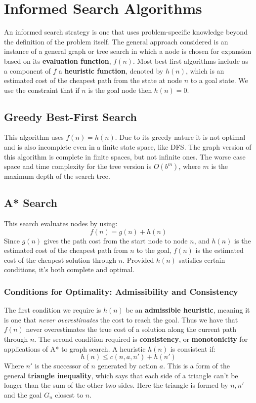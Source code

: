 \documentclass[twoside]{article}
\begin{document}
\section{Informed Search Algorithms}
An informed search strategy is one that uses problem-specific knowledge beyond
the definition of the problem itself. The general approach considered is an
instance of a general graph or tree search in which a node is chosen for 
expansion based on its \textbf{evaluation function}, \(f(n)\). Most best-first
algorithms include as a component of \(f\) a \textbf{heuristic function},
denoted by \(h(n)\), which is an estimated cost of the cheapest path from
the state at node \(n\) to a goal state. We use the constraint that if \(n\)
is the goal node then \(h(n) = 0\).
\subsection{Greedy Best-First Search}
This algorithm uses \(f(n) = h(n)\). Due to its greedy nature it is not 
optimal and is also incomplete even in a finite state space, like DFS. The graph
version of this algorithm is complete in finite spaces, but not infinite ones.
The worse case space and time complexity for the tree version is \(O(b^m)\),
where \(m\) is the maximum depth of the search tree.
\subsection{A* Search}
This search evaluates nodes by using:
\begin{equation}
        f(n) = g(n) + h(n)
\end{equation}
Since \(g(n)\) gives the path cost from the start node to node \(n\), and 
\(h(n)\) is the estimated cost of the cheapest path from \(n\) to the goal,
\(f(n)\) is the estimated cost of the cheapest solution through \(n\). Provided 
\(h(n)\) satisfies certain conditions, it's both complete and optimal.
\subsubsection{Conditions for Optimality: Admissibility and Consistency}
The first condition we require is \(h(n)\) be an \textbf{admissible heuristic},
meaning it is one that \emph{never overestimates} the cost to reach the goal.
Thus we have that \(f(n)\) never overestimates the true cost of a solution along
the current path through \(n\). The second condition required is 
\textbf{consistency}, or \textbf{monotonicity} for applications of A* to graph
search. A heuristic \(h(n)\) is consistent if:
\begin{equation}
        h(n) \leq c(n,a,n') + h(n')
\end{equation}
Where \(n'\) is the successor of \(n\) generated by action \(a\). This is a form
of the general \textbf{triangle inequality}, which says that each side of a 
triangle can't be longer than the sum of the other two sides. Here the triangle
is formed by \(n, n'\) and the goal \(G_n\) closest to \(n\).
\end{document}
